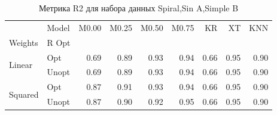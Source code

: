 \begin{table}
\caption{Метрика R2 для набора данных Spiral,Sin A,Simple B}
\label{tab:R2_Spiral,Sin A,Simple B}
\begin{tabular}{llrrrrrrr}
\toprule
 & Model & M0.00 & M0.25 & M0.50 & M0.75 & KR & XT & KNN \\
Weights & R Opt &  &  &  &  &  &  &  \\
\midrule
\multirow[t]{2}{*}{Linear} & Opt & 0.69 & 0.89 & 0.93 & 0.94 & 0.66 & 0.95 & 0.90 \\
 & Unopt & 0.69 & 0.89 & 0.93 & 0.94 & 0.66 & 0.95 & 0.90 \\

\multirow[t]{2}{*}{Squared} & Opt & 0.87 & 0.91 & 0.93 & 0.94 & 0.66 & 0.95 & 0.90 \\
 & Unopt & 0.87 & 0.90 & 0.92 & 0.95 & 0.66 & 0.95 & 0.90 \\

\bottomrule
\end{tabular}
\end{table}
